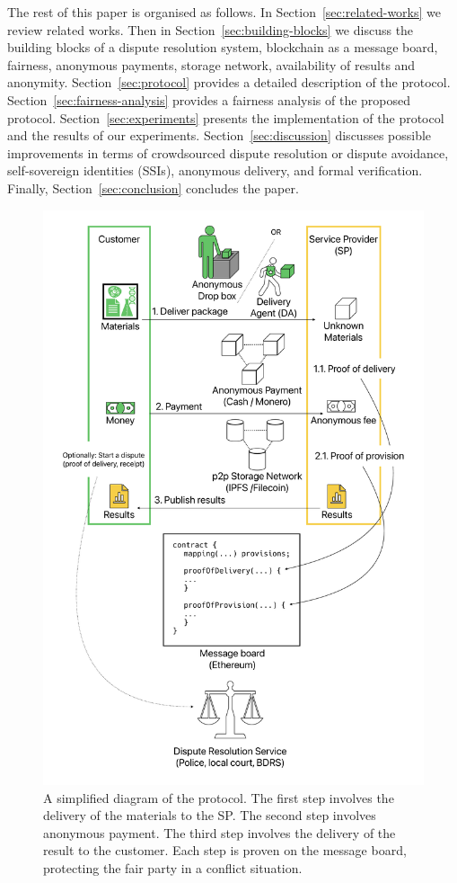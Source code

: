 \documentclass[pdftex,twocolumn,epjc3]{svjour3}
\begin{document}
The rest of this paper is organised as follows. In Section~\ref{sec:related-works} we review related works. Then in Section~\ref{sec:building-blocks} we discuss the building blocks of a dispute resolution system, blockchain as a message board, fairness, anonymous payments, storage network, availability of results and anonymity. Section~\ref{sec:protocol} provides a detailed description of the protocol. Section~\ref{sec:fairness-analysis} provides a fairness analysis of the proposed protocol. Section~\ref{sec:experiments} presents the implementation of the protocol and the results of our experiments. Section~\ref{sec:discussion} discusses possible improvements in terms of crowdsourced dispute resolution or dispute avoidance, self-sovereign identities (SSIs), anonymous delivery, and formal verification. Finally, Section~\ref{sec:conclusion} concludes the paper.

\begin{figure}[h!]
\includegraphics[width=\linewidth]{protocol-overview.pdf}
\centering
\caption{A simplified diagram of the protocol. The first step involves the delivery of the materials to the SP. The second step involves anonymous payment. The third step involves the delivery of the result to the customer. Each step is proven on the message board, protecting the fair party in a conflict situation.}

\label{fig:protocol-overview}
\end{figure}
\end{document}
